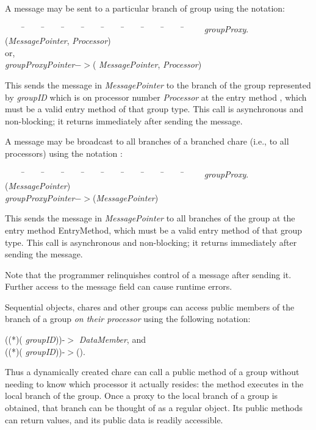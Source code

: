 A message may be sent to a particular branch of group using the
notation:

\begin{tabbing} ~~~~ \=~~~~ \=~~~~ \=~~~~ \=~~~~ \=~~~~ \=~~~~ \=~~~~ \=~~~~
\=~~~~ \kill \> {\it groupProxy}$.$({\it MessagePointer}, {\it
Processor}) \\ \> \> or, \\ \> {\it groupProxyPointer}$->$({\it
MessagePointer}, {\it Processor}) \end{tabbing}

This sends the message in {\it MessagePointer} to the branch of
the group represented by {\it groupID} which is on processor number {\it
Processor} at the entry method , which must be a valid entry
method of that group type. This call is asynchronous and non-blocking; it
returns immediately after sending the message.

A message may be broadcast  to all branches of a branched
chare (i.e., to all processors) using the notation :

\begin{tabbing} ~~~~ \=~~~~ \=~~~~ \=~~~~ \=~~~~ \=~~~~ \=~~~~ \=~~~~ \=~~~~
\=~~~~ \kill \> {\it groupProxy}$.$({\it MessagePointer}) \\ \>
{\it groupProxyPointer}$->$({\it MessagePointer}) \end{tabbing}

This sends the message in {\it MessagePointer} to all branches of the group at
the entry method {\sf EntryMethod}, which must be a valid entry method of that
group type. This call is asynchronous and non-blocking; it returns immediately
after sending the message.

Note that the programmer relinquishes control of a message after sending it.
Further access to the message field can cause runtime errors.


Sequential objects, chares and other groups can access public members of the
branch of a group  {\it on their processor} using
the following notation:

((*)( {\it groupID}))-$>${\it
DataMember}, and \\ ((*)( {\it
groupID}))-$>$(). 

Thus a dynamically created chare can call a public method of a
group without needing to know which processor it actually resides: the method
executes in the local branch of the group.  Once a proxy to the local branch of a group is obtained, that branch can be thought of as a regular object.  Its public methods can return values, and its public data is readily accessible.   

